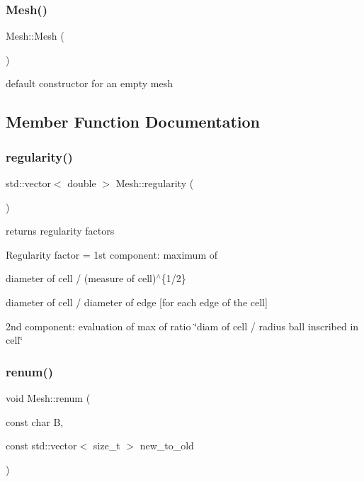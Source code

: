 \subsubsection{\texorpdfstring{Mesh()}{Mesh()}}
{\footnotesize\ttfamily Mesh\+::\+Mesh (\begin{DoxyParamCaption}{ }\end{DoxyParamCaption})}

default constructor for an empty mesh 

\subsection{Member Function Documentation}
\mbox{\label{classHArDCore2D_1_1Mesh_a530b237c8c966c21bdc3a16b4f266660}} 
\subsubsection{\texorpdfstring{regularity()}{regularity()}}
{\footnotesize\ttfamily std\+::vector$<$ double $>$ Mesh\+::regularity (\begin{DoxyParamCaption}{ }\end{DoxyParamCaption})}



returns regularity factors 

Regularity factor = 1st component\+: maximum of
\begin{DoxyItemize}
\item diameter of cell / (measure of cell)$^\wedge$\{1/2\}
\item diameter of cell / diameter of edge \mbox{[}for each edge of the cell\mbox{]}
\end{DoxyItemize}

2nd component\+: evaluation of max of ratio \char`\"{}diam of cell / radius ball inscribed in cell\char`\"{} \mbox{\label{classHArDCore2D_1_1Mesh_af77873bbc892a7a5b37bf4773c55aefc}} 
\subsubsection{\texorpdfstring{renum()}{renum()}}
{\footnotesize\ttfamily void Mesh\+::renum (\begin{DoxyParamCaption}\item[{const char}]{B,  }\item[{const std\+::vector$<$ size\+\_\+t $>$}]{new\+\_\+to\+\_\+old }\end{DoxyParamCaption})}




